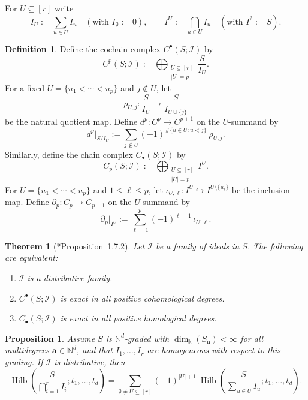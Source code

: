 \documentclass[12pt,reqno]{amsart}
\newtheorem{theorem}[lemma]{Theorem}
\newtheorem{prop}[lemma]{Proposition}
\theoremstyle{definition}
\newtheorem{definition}[lemma]{Definition}
\newcommand{\Hilb}{\operatorname{Hilb}}
\renewcommand{\aa}{\mathbf a}
\renewcommand{\k}{\mathbb{k}}
\newcommand{\cI}{\mathcal{I}}
\newcommand{\NN}{\mathbb{N}}
\def\NN{{\mathbb N}}
\begin{document}
{For $U\subseteq [r]$ write
\[
I_U := \sum_{u\in U} I_u \quad (\text{with } I_\emptyset := 0),\qquad
I^U := \bigcap_{u\in U} I_u \quad (\text{with } I^\emptyset := S).
\]

\begin{definition}\label{def:cech-complexes}
Define the cochain complex $C^\bullet(S;\cI)$ by
\[
C^p(S;\cI) := \bigoplus_{\substack{U\subseteq [r]\\ |U|=p}} \frac{S}{I_U}.
\]
For a fixed $U=\{u_1<\cdots<u_p\}$ and $j\notin U$, let
\[
\rho_{U,j}: \frac{S}{I_U}\longrightarrow \frac{S}{I_{U\cup\{j\}}}
\]
be the natural quotient map. Define $d^p:C^p\to C^{p+1}$ on the $U$-summand by
\[
d^p|_{S/I_U} := \sum_{j\notin U} (-1)^{\#\{u\in U: u<j\}}\ \rho_{U,j}.
\]
Similarly, define the chain complex $C_\bullet(S;\cI)$ by
\[
C_p(S;\cI) := \bigoplus_{\substack{U\subseteq [r]\\ |U|=p}} I^U.
\]
For $U=\{u_1<\cdots<u_p\}$ and $1\le \ell\le p$, let $\iota_{U,\ell}:I^U\hookrightarrow I^{U\setminus\{u_\ell\}}$
be the inclusion map. Define $\partial_p:C_p\to C_{p-1}$ on the $U$-summand by
\[
\partial_p|_{I^U}:=\sum_{\ell=1}^p (-1)^{\ell-1}\,\iota_{U,\ell}.
\]

\end{definition}

\begin{theorem}[{\cite{polishchuk2005quadratic}*{Proposition~1.7.2}}]\label{thm:pp-equivalence}
Let $\cI$ be a family of ideals in $S$. The following are equivalent:
\begin{enumerate}
\item $\cI$ is a distributive family.
\item $C^\bullet(S;\cI)$ is exact in all positive cohomological degrees.
\item $C_\bullet(S;\cI)$ is exact in all positive homological degrees.
\end{enumerate}
\end{theorem}

\begin{prop}\label{prop:hilbert-series-inclusion-exclusion}
Assume $S$ is $\NN^d$-graded with $\dim_\k(S_\aa)<\infty$ for all multidegrees $\aa\in\NN^d$, and that
$I_1,\dots,I_r$ are homogeneous with respect to this grading.
If $\cI$ is distributive, then
\begin{equation}\label{eq:hilb-inclusion-exclusion}
\Hilb\!\left(\frac{S}{\bigcap_{i=1}^r I_i}; t_1,\dots, t_d\right)
=\sum_{\emptyset\neq U\subseteq [r]} (-1)^{|U|+1}\ \Hilb\!\left(\frac{S}{\sum_{u\in U} I_u}; t_1,\dots, t_d\right).
\end{equation}
\end{prop}

}
\end{document}
